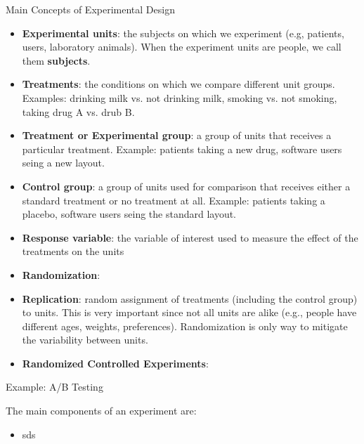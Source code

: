 \documentclass[handout]{beamer}
\begin{document}
\begin{frame}{Main Concepts of Experimental Design}
\scriptsize{


\begin{itemize}
 \item \textbf{Experimental units}: the subjects on which we experiment (e.g, patients, users, laboratory animals). When the experiment units are people, we call them  \textbf{subjects}.
 \item \textbf{Treatments}: the conditions on which we compare different unit groups. Examples: drinking milk vs. not drinking milk, smoking vs. not smoking, taking drug A vs. drub B.
 \item \textbf{Treatment or Experimental group}: a group of units that receives a particular treatment. Example: patients taking a new drug, software users seing a new layout.
 \item \textbf{Control group}: a group of units used for comparison that receives either a standard treatment or no treatment at all. Example: patients taking a placebo, software users seing the standard layout.
 \item \textbf{Response variable}: the variable of interest used to measure the effect of the treatments on the units 

 \item \textbf{Randomization}:
 
  \item \textbf{Replication}: random assignment of treatments (including the control group) to units. This is very important since not all units are alike (e.g., people have different ages, weights, preferences). Randomization is only way to mitigate the variability between units.
  
  \item \textbf{Randomized Controlled Experiments}:
  
\end{itemize}



} 
\end{frame}

\begin{frame}{Example: A/B Testing}
\scriptsize{
The main components of an experiment are:

\begin{itemize}

 \item sds
  
\end{itemize}



} 
\end{frame}
\end{document}
